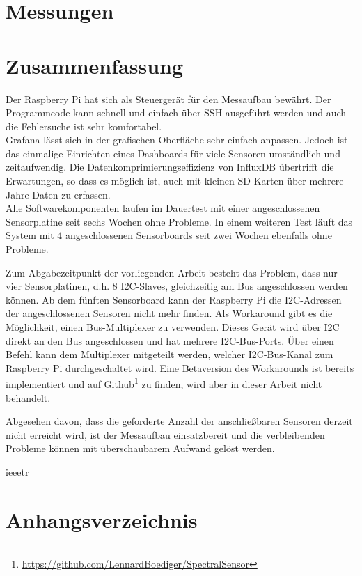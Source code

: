 \documentclass[a4paper,oneside,12pt,titlepage]{scrartcl}   %
\begin{document}
\section{Messungen}

\newpage
\section{Zusammenfassung}
Der Raspberry Pi hat sich als Steuergerät für den Messaufbau bewährt.
Der Programmcode kann schnell und einfach über SSH ausgeführt werden und auch die Fehlersuche ist sehr komfortabel.\\
Grafana lässt sich in der grafischen Oberfläche sehr einfach anpassen. Jedoch ist das einmalige Einrichten eines Dashboards für viele Sensoren umständlich und zeitaufwendig.
Die Datenkomprimierungseffizienz von InfluxDB übertrifft die Erwartungen, so dass es möglich ist, auch mit kleinen SD-Karten über mehrere Jahre Daten zu erfassen.\\
Alle Softwarekomponenten laufen im Dauertest mit einer angeschlossenen Sensorplatine seit sechs Wochen ohne Probleme.
In einem weiteren Test läuft das System mit 4 angeschlossenen Sensorboards seit zwei Wochen ebenfalls ohne Probleme.\smallskip

\noindent Zum Abgabezeitpunkt der vorliegenden Arbeit besteht das Problem, dass nur vier Sensorplatinen, d.h. 8 I2C-Slaves, gleichzeitig am Bus angeschlossen werden können.
Ab dem fünften Sensorboard kann der Raspberry Pi die I2C-Adressen der angeschlossenen Sensoren nicht mehr finden.
Als Workaround gibt es die Möglichkeit, einen Bus-Multiplexer zu verwenden.
Dieses Gerät wird über I2C direkt an den Bus angeschlossen und hat mehrere I2C-Bus-Ports. Über einen Befehl kann dem Multiplexer mitgeteilt werden, welcher I2C-Bus-Kanal zum Raspberry Pi durchgeschaltet wird.
Eine Betaversion des Workarounds ist bereits implementiert und auf Github\footnote{\url{https://github.com/LennardBoediger/SpectralSensor}} zu finden, wird aber in dieser Arbeit nicht behandelt.
\smallskip

\noindent Abgesehen davon, dass die geforderte Anzahl der anschließbaren Sensoren derzeit nicht erreicht wird, ist der Messaufbau einsatzbereit und die verbleibenden Probleme können mit überschaubarem Aufwand gelöst werden.
\newpage

 {ieeetr}
\newpage
\section*{Anhangsverzeichnis}
\end{document}
